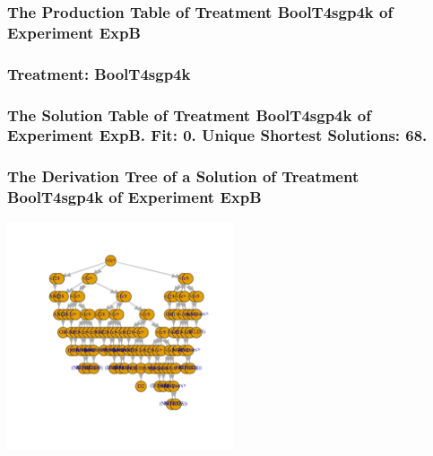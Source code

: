 \documentclass[18pt,c]{beamer}
\begin{document}
 \begin{frame}
 \fontsize{8pt}{9pt}\selectfont
 \frametitle{ The Production Table of Treatment BoolT4sgp4k of Experiment ExpB }

 \label{ExpBGrammarTable029.tex}  
 \end{frame}

 \begin{frame}
 \fontsize{8pt}{9pt}\selectfont
 \frametitle{ Treatment: BoolT4sgp4k }

 \label{ExpBStatsTable029.tex}  
 \end{frame}

 \begin{frame}
 \fontsize{8pt}{9pt}\selectfont
 \frametitle{ The Solution Table of Treatment BoolT4sgp4k of Experiment ExpB. Fit: 0. Unique Shortest Solutions: 68. }

 \label{ExpBSolutionTable022.tex}  
 \end{frame}

 \begin{frame}
 \frametitle{ The Derivation Tree of a Solution of Treatment BoolT4sgp4k of Experiment ExpB }
 \begin{center}
\includegraphics[width=0.5\textwidth, angle=0]
{ExpBDerivationTreeFigure022.pdf}
 \end{center}
 \label{report/ExpBDerivationTreeFigure022.pdf}  
 \end{frame}
\end{document}
